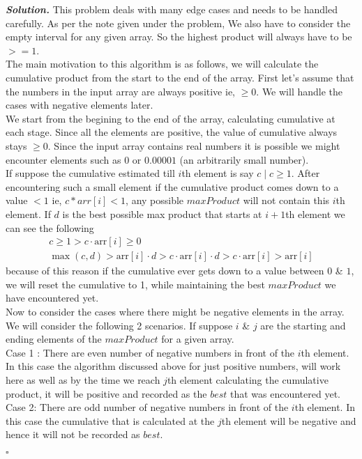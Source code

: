 \documentclass[12pt]{article}
\newenvironment{solution}[1][\it{Solution}]{\textbf{#1. } }{$\square$}
\begin{document}
\begin{solution}
	This problem deals with many edge cases and needs to be handled carefully. As per the note given under the problem, We also have to consider the empty interval for any given array. So the highest product will always have to be $> =1$.   \\
 \indent The main motivation to this algorithm is as follows, we will calculate the cumulative product from the start to the end of the array. First let's assume that the numbers in the input array are always positive ie, $\geq 0$. We will handle the cases with negative elements later. \\
 \indent We start from the begining to the end of the array, calculating cumulative at each stage. Since all the elements are positive, the value of cumulative always stays $\geq 0$. Since the input array contains real numbers it is possible we might encounter elements such as $0$ or $0.00001$ (an arbitrarily small number). \\
 \indent If suppose the cumulative estimated till $i$th element is say $c \mid c \geq 1$. After encountering such a small element if the cumulative product comes down to a value $<1$ ie, $c*arr[i] < 1$, any possible $maxProduct$ will not contain this $i$th element. If $d$ is the best possible max product that starts at $i+1$th element we can see the following
\begin{gather*}
    c \geq 1 > c \cdot \text{arr}[i] \geq 0 \\
    \max(c,d) > \text{arr}[i] \cdot d > c \cdot \text{arr}[i] \cdot d > c \cdot \text{arr}[i] > \text{arr}[i]
\end{gather*}
because of this reason if the cumulative ever gets down to a value between $0$ \& $1$, we will reset the cumulative to 1, while maintaining the best $maxProduct$ we have encountered yet. \\
\indent Now to consider the cases where there might be negative elements in the array. We will consider the following 2 scenarios. If suppose $i$ \& $j$ are the starting and ending elements of the $maxProduct$ for a given array. 
\\ \indent Case 1 : There are even number of negative numbers in front of the $i$th element. In this case the algorithm discussed above for just positive numbers, will work here as well as by the time we reach $j$th element calculating the cumulative product, it will be positive and recorded as the $best$ that was encountered yet. 
\\ \indent Case 2: There are odd number of negative numbers in front of the $i$th element. In this case the cumulative that is calculated at the $j$th element will be negative and hence it will not be recorded as $best$. 

\end{solution}
\end{document}
